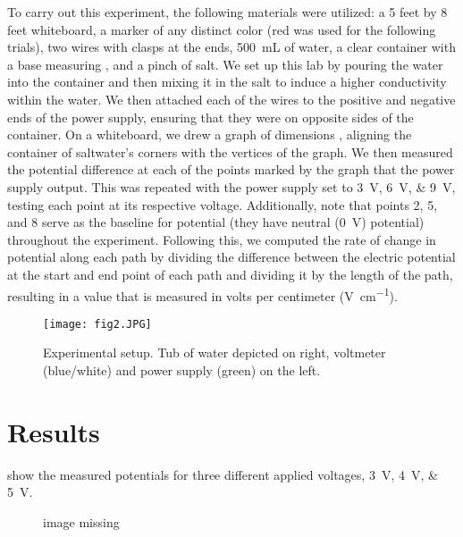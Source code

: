 ﻿\documentclass[10pt,journal,twoside]{IEEEtran}
\begin{document}
To carry out this experiment, the following materials were utilized: a 5 feet by 8 feet whiteboard, a marker of any distinct color (red was used for the following trials), two wires with clasps at the ends, \qty{500}{\milli\liter} of water, a clear container with a base measuring , and a pinch of salt. We set up this lab by pouring the water into the container and then mixing it in the salt to induce a higher conductivity within the water. We then attached each of the  wires to the positive and negative ends of the power supply, ensuring that they were on opposite sides of the container. On a whiteboard, we drew a graph of dimensions , aligning the container of saltwater’s corners with the vertices of the graph. We then measured the potential difference at each of the points marked by the graph that the power supply output. This was repeated with the power supply set to \qtylist{3;6;9}{\volt}, testing each point at its respective voltage.  Additionally, note that points 2, 5, and 8 serve as the baseline for potential (they have neutral (\qty{0}{\volt}) potential) throughout the experiment. Following this, we computed the rate of change in potential along each path by dividing the difference between the electric potential at the start and end point of each path and dividing it by the length of the path, resulting in a value that is measured in volts per centimeter (\unit{\volt\per\centi\meter}).

\begin{figure}
\begin{center}
\texttt{[image: fig2.JPG]}
\end{center}
\caption{Experimental setup. Tub of water depicted on right, voltmeter (blue/white) and power supply (green) on the left.}
\label{fig:2}
\end{figure}










\section{Results}
 show the measured potentials for three different applied voltages, \qtylist{3;4;5}{\volt}. 
\begin{figure}
\begin{center}
image missing
\end{center}
\caption{}
\label{fig:3}
\end{figure}
\end{document}
